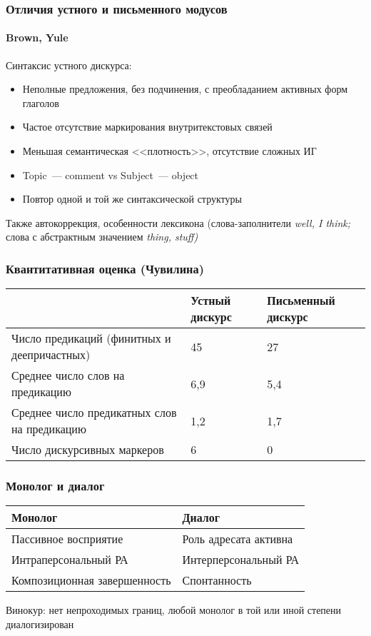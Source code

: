 \begin{frame}
  \frametitle{Отличия устного и письменного модусов}
  \framesubtitle{Brown, Yule}

  Синтаксис устного дискурса: \begin{itemize}
    \item Неполные предложения, без подчинения, с преобладанием активных форм глаголов
    \item Частое отсутствие маркирования внутритекстовых связей
    \item Меньшая семантическая <<плотность>>, отсутствие сложных ИГ
    \item Topic~--- comment vs Subject~--- object
    \item Повтор одной и той же синтаксической структуры
  \end{itemize}

  \vfill

  Также автокоррекция, особенности лексикона (слова-заполнители \textit{well, I think;} слова с абстрактным значением \textit{thing, stuff)}
\end{frame}

\begin{frame}
  \frametitle{Квантитативная оценка (Чувилина)}

  \begin{table}
    \small
    \begin{tabularx}{\textwidth}{p{5cm}XX}
      \toprule
      & Устный дискурс & Письменный дискурс \\ \midrule\midrule
      Число предикаций (финитных и деепричастных) & 45 & 27 \\ \midrule
      Среднее число слов на предикацию & 6,9 & 5,4 \\ \midrule
      Среднее число предикатных слов на предикацию & 1,2 & 1,7 \\ \midrule
      Число дискурсивных маркеров & 6 & 0 \\ \bottomrule
    \end{tabularx}
  \end{table}
\end{frame}

\begin{frame}
  \frametitle{Монолог и диалог}

  \begin{table}
  \small
  \begin{tabularx}{.9\textwidth}{XX}
    \toprule
    Монолог & Диалог \\ \midrule\midrule
    Пассивное восприятие & Роль адресата активна \\ \midrule
    Интраперсональный РА & Интерперсональный РА \\ \midrule
    Композиционная завершенность & Спонтанность \\ \bottomrule
    \end{tabularx}
  \end{table}

  Винокур: нет непроходимых границ, любой монолог в той или иной степени диалогизирован
\end{frame}

